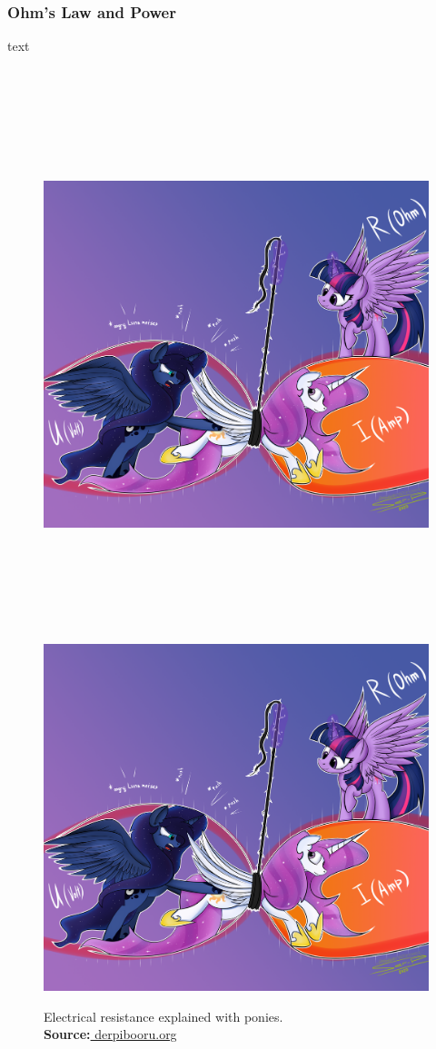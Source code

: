 \documentclass[11pt]{article}
\begin{document}
\subsubsection{Ohm's Law and Power}
text\par
\begin{figure}[!h]
  \centering
  \ifdefined\HCode
  \includegraphics[height=45em,keepaspectratio]
  {src/assets/electricity_pony.png}
  \else
  \includegraphics[height=0.7\textwidth,keepaspectratio]
  {src/assets/electricity_pony.png}
  \fi
  \caption{Electrical resistance explained with ponies.\\
    \textbf{Source:}\href{
      https://derpibooru.org/images/2461820?q=electrical+resistance
    }{
      derpibooru.org
    }
  }
\end{figure}
\end{document}

